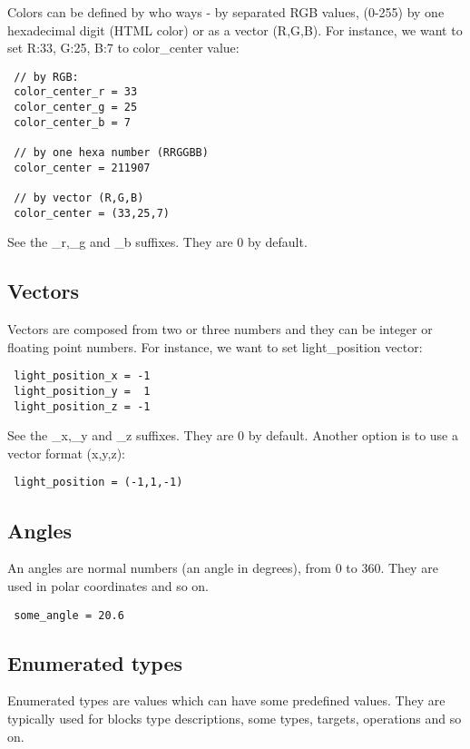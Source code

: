\documentclass[11pt]{article}
\begin{document}
Colors can be defined by who ways - by separated RGB values,
(0-255) by one hexadecimal digit (HTML color) or as a vector (R,G,B). 
For instance, we want to set R:33, G:25, B:7 to color\_center value:

\begin{verbatim}
 // by RGB:
 color_center_r = 33
 color_center_g = 25
 color_center_b = 7
 
 // by one hexa number (RRGGBB)
 color_center = 211907
 
 // by vector (R,G,B)
 color_center = (33,25,7) 
\end{verbatim}

See the \_r,\_g and \_b suffixes. They are 0 by default.

\subsection{Vectors}

Vectors are composed from two or three numbers and they
can be integer or floating point numbers. For instance, we want to 
set light\_position vector:

\begin{verbatim}
 light_position_x = -1
 light_position_y =  1
 light_position_z = -1
\end{verbatim}

See the \_x,\_y and \_z suffixes. They are 0 by default. Another option is
to use a vector format (x,y,z):

\begin{verbatim}
 light_position = (-1,1,-1)
\end{verbatim}

\subsection{Angles}

An angles are normal numbers (an angle in degrees), from 0 to 360. 
They are used in polar coordinates and so on.

\begin{verbatim}
 some_angle = 20.6
\end{verbatim}

\subsection{Enumerated types}

Enumerated types are values which can have some predefined values. 
They are typically used for blocks type descriptions, some types,
targets, operations and so on.
\end{document}
